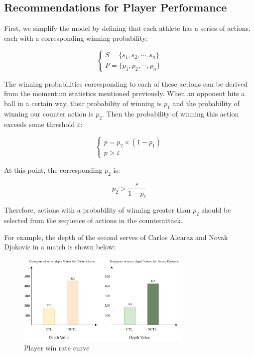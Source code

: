 \documentclass[12pt]{article}  %
\begin{document}
\subsection{Recommendations for Player Performance}

First, we simplify the model by defining that each athlete has a series of actions, each with a corresponding winning probability:

\begin{equation}
	\begin{cases}
		S = \{s_1, s_2, \cdots, s_n\}\\[3pt]
		P = \{p_1, p_2, \cdots, p_n\}
	\end{cases}
\end{equation}

The winning probabilities corresponding to each of these actions can be derived from the momentum statistics mentioned previously. When an opponent hits a ball in a certain way, their probability of winning is \(p_1\) and the probability of winning our counter action is \(p_2\). Then the probability of winning this action exceeds some threshold \(\varepsilon\):

\begin{equation}
	\begin{cases}
		p = p_2 \times (1 - p_1)\\[3pt]
		p > \varepsilon
	\end{cases}
\end{equation}

At this point, the corresponding \(p_2\) is:

\begin{equation}
	p_2 > \dfrac{\varepsilon}{1 - p_1}
\end{equation}

Therefore, actions with a probability of winning greater than \(p_2\) should be selected from the sequence of actions in the counterattack.

For example, the depth of the second serves of Carlos Alcaraz and Novak Djokovic in a match is shown below:

\begin{figure}[htbp]
    \centering
    \includegraphics[width=0.75\textwidth]{picture/柱状图.pdf} 	%
    \caption{Player win rate curve}		%
    \label{fig:11}							%
\end{figure}
\FloatBarrier
\end{document}
